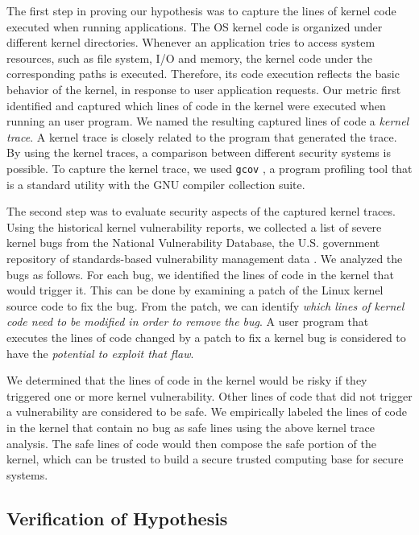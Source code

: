 The first step in proving our hypothesis was to capture the lines of kernel
code executed 
when running applications. The OS kernel code is organized under different
kernel directories. 
Whenever an application tries to access system resources, such as file
system, I/O and memory, the kernel code under the corresponding paths is executed. Therefore, 
its code execution reflects the basic behavior of the kernel, in response
to user application requests.
Our metric first identified and captured which lines of code in the kernel
were executed 
when running an user program. We named the resulting captured lines of
code a \textit{kernel trace}. 
A kernel trace is closely related to the program that generated the trace. 
By using the kernel traces, a comparison between different
security systems is possible. 
To capture the kernel trace, we used \texttt{gcov} \cite{gcov}, a program profiling
tool that is a standard utility with the GNU compiler collection 
suite.


The second step was to evaluate security aspects of the captured kernel traces.%
Using the historical kernel vulnerability reports, we collected a list of
severe kernel bugs from 
the National Vulnerability Database, the U.S. government repository of
standards-based 
vulnerability management data \cite{NVD}. We analyzed the bugs as
follows. For each bug, we identified the lines of code 
in the kernel that would trigger it. This can be done by examining 
a patch of the Linux kernel source code to fix the bug. From the patch, 
we can identify \textit{which lines of kernel code need to be modified in order to
remove the bug}. 
A user program that executes the lines of code changed by a patch to fix a
kernel bug is considered to have the \textit{potential to exploit that flaw}.

We determined that the lines of code in the kernel would be risky 
if they triggered one or more kernel vulnerability. Other lines of code 
that did not trigger a vulnerability are considered to be safe. We empirically labeled the lines of code in the kernel that contain no bug as safe lines using the above kernel trace analysis.
The safe lines of code would then compose the safe portion of the kernel, which can be trusted to build a secure trusted computing base for secure systems.

\subsection{Verification of Hypothesis}
\label{Verification-of-Hypothesis}

